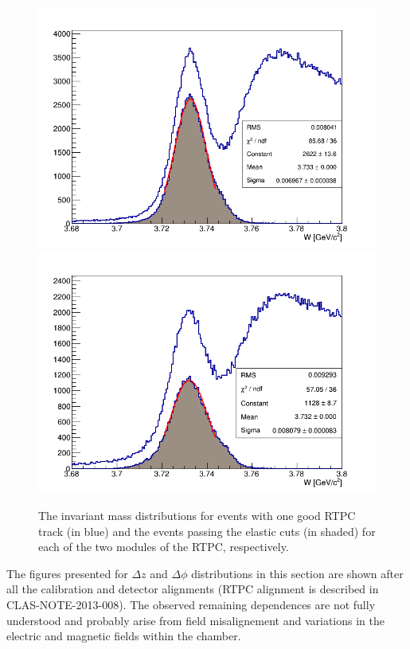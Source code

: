 \begin{figure}[tbp]
\includegraphics[scale=0.32]{fig_rtpc/fit_W_distribution_l.png}
\includegraphics[scale=0.32]{fig_rtpc/fit_W_distribution_r.png}
\caption[]{The invariant mass distributions for events with one good RTPC track (in blue) and the events passing the elastic cuts (in shaded) for each of the two modules of the RTPC, respectively.}
\label{fig:W_elastic}
\end{figure}

The figures presented for $\Delta z$ and $\Delta\phi$ distributions in this section are shown after all the
calibration and detector alignments (RTPC alignment is described in 
CLAS-NOTE-2013-008). The observed remaining dependences are not fully 
understood and probably arise from field misalignement and variations in the 
electric and magnetic fields within the chamber.
 
